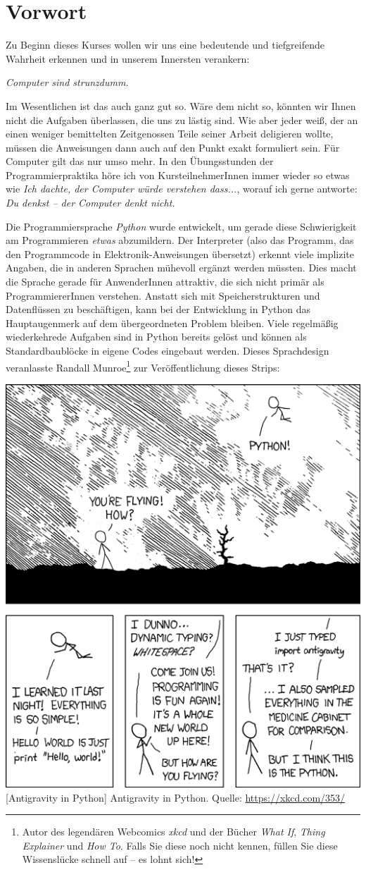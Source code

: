 \chapter*{Vorwort}
Zu Beginn dieses Kurses wollen wir uns eine bedeutende und tiefgreifende Wahrheit erkennen und in unserem Innersten verankern:

\begin{center}
\begin{Huge}
	\emph{Computer sind strunzdumm.}
\end{Huge}
\end{center}

Im Wesentlichen ist das auch ganz gut so. Wäre dem nicht so, könnten wir Ihnen nicht die Aufgaben überlassen, die uns zu lästig sind. Wie aber jeder weiß, der an einen weniger bemittelten Zeitgenossen Teile seiner Arbeit deligieren wollte, müssen die Anweisungen dann auch auf den Punkt exakt formuliert sein. Für Computer gilt das nur umso mehr. In den Übungsstunden der Programmierpraktika höre ich von KursteilnehmerInnen immer wieder so etwas wie \emph{Ich dachte, der Computer würde verstehen dass...}, worauf ich gerne antworte: \emph{Du denkst -- der Computer denkt nicht.}

Die Programmiersprache \emph{Python} wurde entwickelt, um gerade diese Schwierigkeit am Programmieren \emph{etwas} abzumildern. Der Interpreter (also das Programm, das den Programmcode in Elektronik-Anweisungen übersetzt) erkennt viele implizite Angaben, die in anderen Sprachen mühevoll ergänzt werden müssten. Dies macht die Sprache gerade für AnwenderInnen attraktiv, die sich nicht primär als Programmierer\-Innen verstehen. Anstatt sich mit Speicherstrukturen und Datenflüssen zu beschäftigen, kann bei der Entwicklung in Python das Hauptaugenmerk auf dem übergeordneten Problem bleiben. Viele regelmäßig wiederkehrede Aufgaben sind in Python bereits gelöst und können als Standardbaublöcke in eigene Codes eingebaut werden. Dieses Sprachdesign veranlasste Randall Munroe\footnote{Autor des legendären Webcomics \emph{xkcd} und der Bücher \emph{What If}, \emph{Thing Explainer} und \emph{How To}. Falls Sie diese noch nicht kennen, füllen Sie diese Wissenslücke schnell auf -- es lohnt sich!} zur Veröffentlichung dieses Strips:

\begin{center}
\includegraphics[width=.4\linewidth]{./gfx/xkcd-python}
	[Antigravity in Python]
	{Antigravity in Python. Quelle: \url{https://xkcd.com/353/}}
\end{center}

